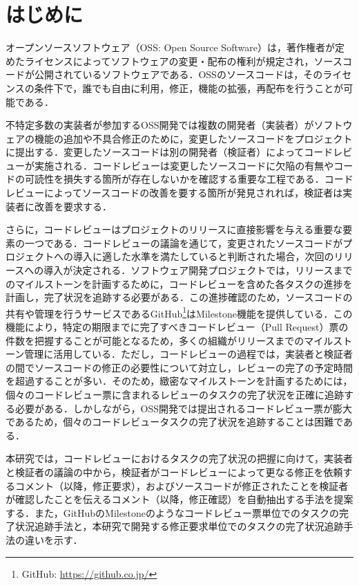 \documentclass[11pt]{jreport}
\begin{document}
\chapter{はじめに}\label{chap:intro}

オープンソースソフトウェア（OSS: Open Source Software）は，著作権者が定めたライセンスによってソフトウェアの変更・配布の権利が規定され，ソースコードが公開されているソフトウェアである．OSSのソースコードは，そのライセンスの条件下で，誰でも自由に利用，修正，機能の拡張，再配布を行うことが可能である\cite{oss}．

不特定多数の実装者が参加するOSS開発では複数の開発者（実装者）がソフトウェアの機能の追加や不具合修正のために，変更したソースコードをプロジェクトに提出する．変更したソースコードは別の開発者（検証者）によってコードレビューが実施される．コードレビューは変更したソースコードに欠陥の有無やコードの可読性を損失する箇所が存在しないかを確認する重要な工程である\cite{quality1}\cite{quality2}．コードレビューによってソースコードの改善を要する箇所が発見されれば，検証者は実装者に改善を要求する． 

さらに，コードレビューはプロジェクトのリリースに直接影響を与える重要な要素の一つである．コードレビューの議論を通じて，変更されたソースコードがプロジェクトへの導入に適した水準を満たしていると判断された場合，次回のリリースへの導入が決定される．ソフトウェア開発プロジェクトでは，リリースまでのマイルストーンを計画するために，コードレビューを含めた各タスクの進捗を計画し，完了状況を追跡する必要がある\cite{review_time}．この進捗確認のため，ソースコードの共有や管理を行うサービスであるGitHub\footnote{GitHub: \url{https://github.co.jp/}}はMilestone機能を提供している．この機能により，特定の期限までに完了すべきコードレビュー（Pull Request）票の件数を把握することが可能となるため，多くの組織がリリースまでのマイルストーン管理に活用している．ただし，コードレビューの過程では，実装者と検証者の間でソースコードの修正の必要性について対立し，レビューの完了の予定時間を超過することが多い\cite{review_time1}\cite{review_time2}．そのため，緻密なマイルストーンを計画するためには，個々のコードレビュー票に含まれるレビューのタスクの完了状況を正確に追跡する必要がある．しかしながら，OSS開発では提出されるコードレビュー票が膨大であるため，個々のコードレビュータスクの完了状況を追跡することは困難である．

本研究では，コードレビューにおけるタスクの完了状況の把握に向けて，実装者と検証者の議論の中から，検証者がコードレビューによって更なる修正を依頼するコメント（以降，修正要求），およびソースコードが修正されたことを検証者が確認したことを伝えるコメント（以降，修正確認）を自動抽出する手法を提案する．また，GitHubのMilestoneのようなコードレビュー票単位でのタスクの完了状況追跡手法と，本研究で開発する修正要求単位でのタスクの完了状況追跡手法の違いを示す．
\end{document}

